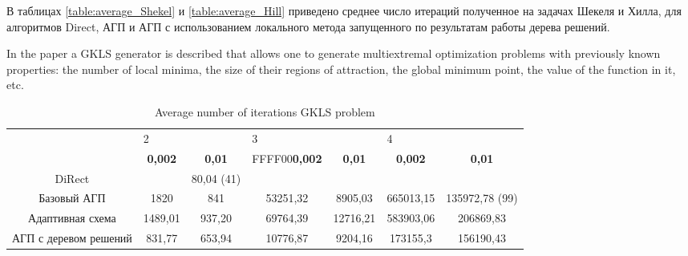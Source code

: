 \documentclass[entropy,article,submit,moreauthors,pdftex]{Definitions/mdpi}
\begin{document}
В таблицах \ref{table:average_Shekel} и \ref{table:average_Hill} приведено среднее число итераций полученное на  задачах Шекеля и Хилла, для алгоритмов Direct, АГП и АГП с использованием локального метода запущенного по результатам работы дерева решений.


In the paper \cite{Gaviano2003} a GKLS generator is described that allows one to generate multiextremal optimization problems with previously known properties: the number of local minima, the size of their regions of attraction, the global minimum point, the value of the function in it, etc.

\begin{table}[]
	\caption{Average number of iterations GKLS problem}\label{table:average_GKLS}
	\center
\begin{tabular}{ccccccc}
\hline\noalign{\smallskip}

                      & \multicolumn{2}{l}{2}                                                          & \multicolumn{2}{l}{3}                                                          & \multicolumn{2}{l}{4}                                  \\
                      & \textbf{0,002} & \textbf{0,01} & {FFFF00}\textbf{0,002} & \textbf{0,01} & \textbf{0,002} & \textbf{0,01} \\
DiRect                &                                        & 80,04 (41)                            &                                        &                                       &                &                                       \\
Базовый АГП           & 1820                                   & 841                                   & 53251,32                               & 8905,03                               & 665013,15      & 135972,78 (99)                        \\
Адаптивная схема      & 1489,01                                & 937,20                                & 69764,39                               & 12716,21                              & 583903,06      & 206869,83                             \\
АГП с деревом решений & 831,77                                 & 653,94                                & 10776,87                               & 9204,16                               & 173155,3       & 156190,43                            
\end{tabular}
\end{table}
\end{document}

